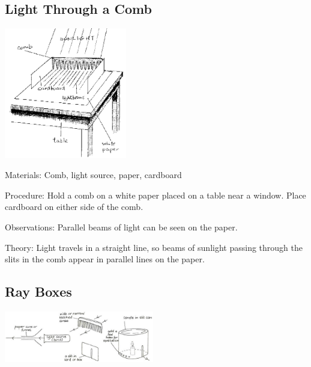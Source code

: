 \begin{multicols}{2}
\subsection{Light Through a Comb}

\begin{center}
\includegraphics[width=0.4\textwidth]{./img/source/light-comb.png}
\end{center}

\begin{description*}
\item[Materials:]{Comb, light source, paper, cardboard}
\item[Procedure:]{Hold a comb on a white paper placed on a table near a window. Place cardboard on either side of the comb.}
\item[Observations:]{Parallel beams of light can be seen on the paper.}
\item[Theory:]{Light travels in a straight line, so beams of sunlight passing through the slits in the comb appear in parallel lines on the paper.}
\end{description*}

\subsection{Ray Boxes}

\begin{center}
\includegraphics[width=0.49\textwidth]{./img/vso/ray-boxes.png}
\end{center}


\end{multicols}
